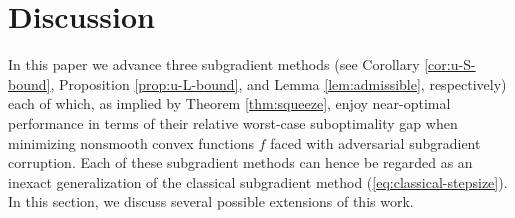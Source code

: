 \documentclass{article}
\begin{document}



\section{Discussion}

In this paper we advance three subgradient methods (see Corollary \ref{cor:u-S-bound}, Proposition \ref{prop:u-L-bound}, and Lemma \ref{lem:admissible}, respectively) each of which, as implied by Theorem \ref{thm:squeeze}, enjoy near-optimal performance in terms of their relative worst-case suboptimality gap when minimizing nonsmooth convex functions $f$ faced with adversarial subgradient corruption.
Each of these subgradient methods can hence be regarded as an inexact generalization of the classical subgradient method (\ref{eq:classical-stepsize}).
In this section, we discuss several possible extensions of this work.
\end{document}

